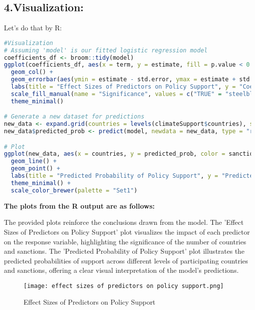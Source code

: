 \documentclass[12pt,letterpaper]{article}
\begin{document}
\subsection*{4.Visualization:}
Let's do that by R:
\begin{lstlisting}[language=R]
#Visualization
# Assuming 'model' is our fitted logistic regression model
coefficients_df <- broom::tidy(model)
ggplot(coefficients_df, aes(x = term, y = estimate, fill = p.value < 0.05)) +
  geom_col() +
  geom_errorbar(aes(ymin = estimate - std.error, ymax = estimate + std.error), width = 0.2) +
  labs(title = "Effect Sizes of Predictors on Policy Support", y = "Coefficient Estimate", x = "") +
  scale_fill_manual(name = "Significance", values = c("TRUE" = "steelblue", "FALSE" = "grey"), labels = c("TRUE" = "Significant", "FALSE" = "Not Significant")) +
  theme_minimal()

# Generate a new dataset for predictions
new_data <- expand.grid(countries = levels(climateSupport$countries), sanctions = levels(climateSupport$sanctions))
new_data$predicted_prob <- predict(model, newdata = new_data, type = "response")

# Plot
ggplot(new_data, aes(x = countries, y = predicted_prob, color = sanctions, group = sanctions)) + # Added 'group = sanctions' here
  geom_line() +
  geom_point() +
  labs(title = "Predicted Probability of Policy Support", y = "Predicted Probability", x = "Number of Participating Countries") +
  theme_minimal() +
  scale_color_brewer(palette = "Set1")
  \end{lstlisting}
  
\textbf{The plots from the R output are as follows:}

The provided plots reinforce the conclusions drawn from the model. The 'Effect Sizes of Predictors on Policy Support' plot visualizes the impact of each predictor on the response variable, highlighting the significance of the number of countries and sanctions. The 'Predicted Probability of Policy Support' plot illustrates the predicted probabilities of support across different levels of participating countries and sanctions, offering a clear visual interpretation of the model's predictions.

\begin{figure}[H]
\centering
\texttt{[image: effect sizes of predictors on policy support.png]}
\caption{Effect Sizes of Predictors on Policy Support}
\label{fig:effect-sizes}
\end{figure}
\end{document}

